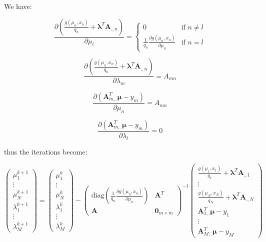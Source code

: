 \documentclass{tex/note}
\begin{document}
We have:

\begin{equation*}
\frac{\partial \left( \frac{g \left( \mu_n , x_n \right)}{q_n} + \bm{\lambda}^T \bm{A}_{.,n} \right)}{\partial \mu_l} =
\begin{cases}
0 & \text{if } n \neq l \\
\frac{1}{q_n} \frac{\partial g \left( \mu_n , x_n \right)}{\partial \mu_n} & \text{if } n = l
\end{cases}
\end{equation*}

\begin{equation*}
\frac{\partial \left( \frac{g \left( \mu_n , x_n \right)}{q_n} + \bm{\lambda}^T \bm{A}_{.,n} \right)}{\partial \lambda_m} = A_{mn}
\end{equation*}

\begin{equation*}
\frac{\partial \left( \bm{A}_{m,.}^T \bm{\mu} - y_m \right)}{\partial \mu_n} = A_{mn}
\end{equation*}

\begin{equation*}
\frac{\partial \left( \bm{A}_{m,.}^T \bm{\mu} - y_m \right)}{\partial \lambda_l} = 0
\end{equation*}

thus the iterations become:

\begin{equation*}
\begin{pmatrix} \mu_1^{k + 1} \\ \vdots \\ \mu_N^{k + 1} \\ \lambda_1^{k + 1} \\ \vdots \\ \lambda_M^{k + 1} \end{pmatrix} = \begin{pmatrix} \mu_1^k \\ \vdots \\ \mu_N^k \\ \lambda_1^k \\ \vdots \\ \lambda_M^k \end{pmatrix} - \begin{pmatrix} \text{diag} \left( \frac{1}{q_n} \frac{\partial g \left( \mu_n , x_n \right)}{\partial \mu_n} \right) & \bm{A}^T \\ \bm{A} & \bm{0}_{m \times m} \end{pmatrix} ^{-1} \begin{pmatrix} \frac{g \left( \mu_1 , x_1 \right)}{q_1} + \bm{\lambda}^T \bm{A}_{.,1} \\ \vdots \\ \frac{g \left( \mu_N , x_N \right)}{q_N} + \bm{\lambda}^T \bm{A}_{.,N} \\ \bm{A}_{1,.}^T \bm{\mu} - y_1 \\ \vdots \\ \bm{A}_{M,.}^T \bm{\mu} - y_M \end{pmatrix}
\end{equation*}
\end{document}
